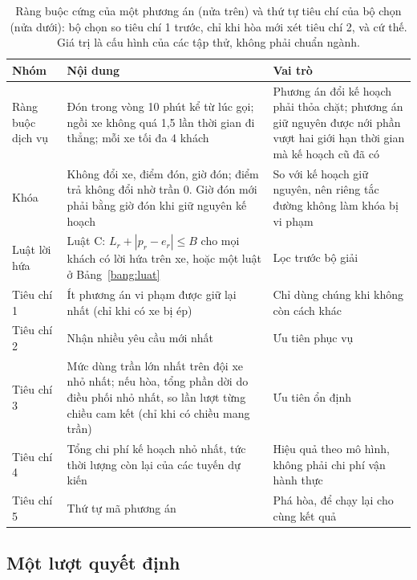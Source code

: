 \begin{table}[htbp]
\centering
\caption{Ràng buộc cứng của một phương án (nửa trên) và thứ tự tiêu chí của bộ chọn (nửa dưới): bộ chọn so
tiêu chí 1 trước, chỉ khi hòa mới xét tiêu chí 2, và cứ thế. Giá trị là cấu hình của các tập thử, không phải
chuẩn ngành.}
\label{bang:rangbuoc}
\small
\begin{tabular}{@{}p{2.4cm}p{7.6cm}p{4.8cm}@{}}
\toprule
\textbf{Nhóm} & \textbf{Nội dung} & \textbf{Vai trò}\\
\midrule
Ràng buộc dịch vụ & Đón trong vòng 10 phút kể từ lúc gọi; ngồi xe không quá 1,5 lần thời gian đi thẳng;
mỗi xe tối đa 4 khách & Phương án đổi kế hoạch phải thỏa chặt; phương án giữ nguyên được nới phần vượt hai
giới hạn thời gian mà kế hoạch cũ đã có\\
Khóa & Không đổi xe, điểm đón, giờ đón; điểm trả không đổi nhờ trần 0. Giờ đón mới phải bằng giờ đón khi giữ
nguyên kế hoạch & So với kế hoạch giữ nguyên, nên riêng tắc đường không làm khóa bị vi phạm\\
Luật lời hứa & Luật C: $L_r + |p_r - e_r| \le B$ cho mọi khách có lời hứa trên xe, hoặc một luật ở
Bảng~\ref{bang:luat} & Lọc trước bộ giải\\
\midrule
Tiêu chí 1 & Ít phương án vi phạm được giữ lại nhất (chỉ khi có xe bị ép) & Chỉ dùng chúng khi không còn
cách khác\\
Tiêu chí 2 & Nhận nhiều yêu cầu mới nhất & Ưu tiên phục vụ\\
Tiêu chí 3 & Mức dùng trần lớn nhất trên đội xe nhỏ nhất; nếu hòa, tổng phần dời do điều phối nhỏ nhất, so
lần lượt từng chiều cam kết (chỉ khi có chiều mang trần) & Ưu tiên ổn định\\
Tiêu chí 4 & Tổng chi phí kế hoạch nhỏ nhất, tức thời lượng còn lại của các tuyến dự kiến & Hiệu quả theo mô
hình, không phải chi phí vận hành thực\\
Tiêu chí 5 & Thứ tự mã phương án & Phá hòa, để chạy lại cho cùng kết quả\\
\bottomrule
\end{tabular}
\end{table}

\subsection{Một lượt quyết định}
\label{muc:luotquyetdinh}

